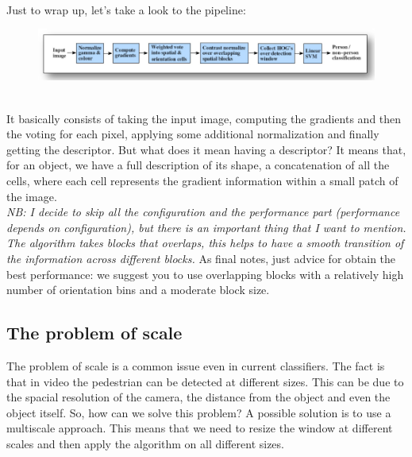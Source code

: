 \\Just to wrap up, let's take a look to the pipeline:
\begin{figure}[h]
    \centering
    \includegraphics[scale=0.45]{Figures/HOG_Pipeline.png}
\end{figure}
\\It basically consists of taking the input image, computing the gradients and then the voting for each pixel, applying some additional normalization and finally getting the descriptor.
But what does it mean having a descriptor? It means that, for an object, we have a full description of its shape, a concatenation of all the cells, where each cell represents the gradient information within a small patch of the image.
\\\textit{NB: I decide to skip all the configuration and the performance part (performance depends on configuration), but there is an important thing that I want to mention. The algorithm takes blocks that overlaps, this helps to have a smooth transition of the information across different blocks.}
As final notes, just advice for obtain the best performance: we suggest you to use overlapping blocks with a relatively high number of orientation bins and a moderate block size.
\subsection{The problem of scale}
The problem of scale is a common issue even in current classifiers. The fact is that in video the pedestrian can be detected at different sizes.
This can be due to the spacial resolution of the camera, the distance from the object and even the object itself.
So, how can we solve this problem? A possible solution is to use a multiscale approach. This means that we need to resize the window at different scales and then apply the algorithm on all different sizes.
